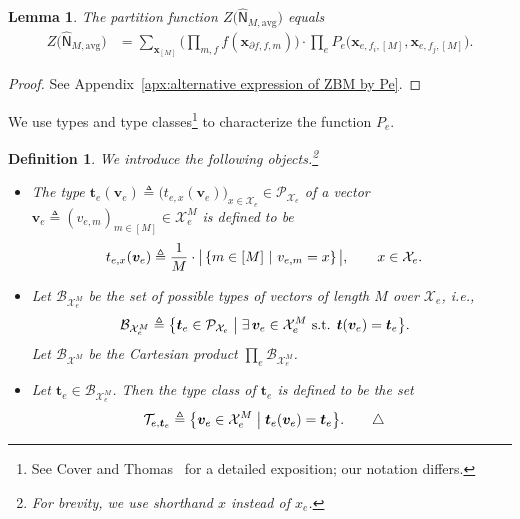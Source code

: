 \documentclass[journal]{IEEEtran}
\newcommand{\add}[1]{{\color{black}#1}}
\newtheorem{lemma}[theorem]{Lemma}
\newtheorem{definition}[theorem]{Definition}
\newcommand{\vect}[1]{ \bm{#1} }
\newcommand{\set}[1]{\mathcal{#1}}
\newcommand{\xe}{ x_{e} }
\newcommand{\setxe}{ \mathcal{X}_{e} }
\newcommand{\vv}{ \vect{v} }
\newcommand{\vx}{ \vect{x} }
\newcommand{\vt}{ \vect{t} }
\newcommand{\graphN}{ \mathsf{N} }
\newcommand{\defeq}{ \triangleq }
\newcommand{\hgraphNavg}{ \hat{\graphN}_{M,\mathrm{avg}} }
\newcommand{\efi}{ e,f_i }
\newcommand{\efj}{ e,f_j }
\newcommand{\setpff}{ \partial f, f }
\newcommand*{\ie}{\textit{i.e.}}
\newcommand{\pmf}[1]{ \set{P}_{#1} }
\begin{document}
\begin{lemma}\label{sec:sst:lem:6}
  The partition function $ Z\bigl( \hgraphNavg \bigr) $ equals
  \begin{align*}
    Z\bigl( \hgraphNavg \bigr) & \!\! =\!\! \sum_{\vx_{[M]}}
    \Biggl( \prod_{m,f} f(\vx_{\setpff,m}) \!\! \Biggr)    \!\cdot \! \prod_{e} \! P_e\bigl( \vx_{\efi,[M]}, \vx_{\efj,[M]} \bigr).
  \end{align*}
\end{lemma}
\begin{proof}
  See Appendix~\ref{apx:alternative expression of ZBM by Pe}.
\end{proof}

\add{We use types and type classes}\footnote{\add{See Cover and
    Thomas~\cite{Cover:Thomas:06:1} for a detailed exposition; our notation
    differs.}} to characterize the function $P_e$.

\begin{definition}\label{sec:sst:def:6}
  We introduce the following objects.\footnote{\add{For brevity, we use shorthand $x$ instead of $\xe$.}}
  \begin{itemize}

    \item The type
          $\vt_e(\vv_e) \defeq \bigl( t_{e,x}(\vv_e) \bigr)_{\! x \in \set{X}_e} \in \pmf{\setxe}$ of a
          vector $\vv_e \defeq (v_{e,m})_{m \in [M]} \in \set{X}_e^M$ is defined to be
          \begin{align*}
            t_{e,x}(\vv_e)
             & \defeq
            \frac{1}{M}
            \cdot
            \bigl| \hskip0.5mm
            \left\{
            m \in [M]
            \ \middle| \
            v_{e,m} = x
            \right\} \hskip0.5mm
            \bigr|,
            \qquad x \in \set{X}_e.
          \end{align*}

    \item Let $\set{B}_{\set{X}_e^M}$ be the set of possible types of vectors of
          length $M$ over $\set{X}_e$, \ie,
          \begin{align*}
            \set{B}_{\set{X}_e^M}
             & \defeq
            \bigl\{
            \vt_e \in \pmf{\setxe}
            \bigm|
            \exists\, \vv_e \in \set{X}_e^M
            \text{ s.t. } \vt(\vv_e) = \vt_e
            \bigr\}.
          \end{align*}
          Let $ \set{B}_{\set{X}^M} $ be the Cartesian product $ \prod_{e} \set{B}_{\set{X}_e^M} $.

    \item Let $\vt_e \in \set{B}_{\set{X}_e^M}$. Then the type class of $\vt_e$ is defined to be the set
          \begin{align*}
            \set{T}_{e,\vt_e}
             & \defeq
            \bigl\{
            \vv_e \in \set{X}_e^M
            \bigm|
            \vt_e(\vv_e) = \vt_e
            \bigr\}. \tag*{\ensuremath{\triangle}}
          \end{align*}

  \end{itemize}
\end{definition}
\end{document}
